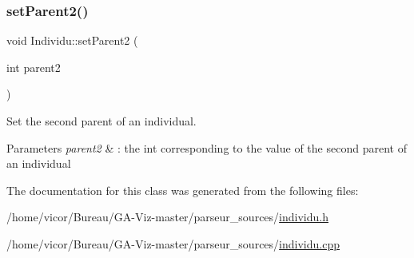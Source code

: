 \subsubsection{\texorpdfstring{set\+Parent2()}{setParent2()}}
{\footnotesize\ttfamily void Individu\+::set\+Parent2 (\begin{DoxyParamCaption}\item[{int}]{parent2 }\end{DoxyParamCaption})}



Set the second parent of an individual. 


\begin{DoxyParams}{Parameters}
{\em parent2} & \+: the int corresponding to the value of the second parent of an individual \\
\hline
\end{DoxyParams}


The documentation for this class was generated from the following files\+:\begin{DoxyCompactItemize}
\item 
/home/vicor/\+Bureau/\+G\+A-\/\+Viz-\/master/parseur\+\_\+sources/\hyperlink{individu_8h}{individu.\+h}\item 
/home/vicor/\+Bureau/\+G\+A-\/\+Viz-\/master/parseur\+\_\+sources/\hyperlink{individu_8cpp}{individu.\+cpp}\end{DoxyCompactItemize}
